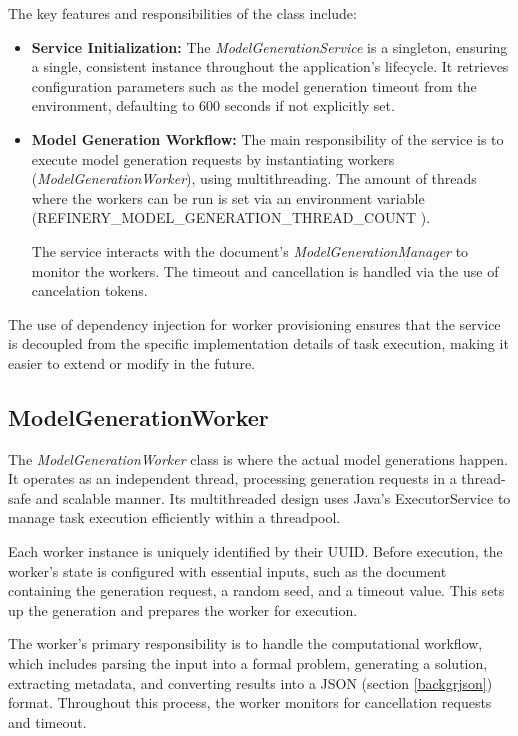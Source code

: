			The key features and responsibilities of the class include:
			\begin{itemize}
				\item{\textbf{Service Initialization:}} The \textit{ModelGenerationService} is a singleton, 
				ensuring a single, consistent instance throughout the application's lifecycle.
				It retrieves configuration parameters such as the model generation timeout 
				from the environment, defaulting to 600 seconds if not explicitly set.
				\item{\textbf{Model Generation Workflow:}} The main responsibility of the service is to execute model generation requests 
				by instantiating workers (\textit{ModelGenerationWorker}), using multithreading. The amount of threads 
				where the workers can be run is set via an environment variable (REFINERY\_MODEL\_GENERATION\_THREAD\_COUNT 
				\cite{generationthread}).

				The service interacts with the document’s \textit{ModelGenerationManager} to monitor the workers.
				The timeout and cancellation is handled via the use of cancelation tokens.
			\end{itemize}
			The use of dependency injection for worker provisioning ensures that the service is decoupled from the specific implementation details
			of task execution, making it easier to extend or modify in the future.

		\subsection{ModelGenerationWorker} \label{ModelGenerationWorker}
			The \textit{ModelGenerationWorker} class is where the actual model generations happen. 
			It operates as an independent thread, processing generation requests in a thread-safe and scalable manner. 
			Its multithreaded design uses Java's ExecutorService to manage task execution efficiently within a threadpool.

			Each worker instance is uniquely identified by their UUID. Before execution, the worker’s state is configured 
			with essential inputs, such as the document containing the generation request, a random seed, and a timeout value. 
			This sets up the generation and prepares the worker for execution.

			The worker’s primary responsibility is to handle the computational workflow, 
			which includes parsing the input into a formal problem, generating a solution, extracting metadata, 
			and converting results into a JSON (section \ref{backgrjson}) format. 
			Throughout this process, the worker monitors for cancellation requests and timeout. 

